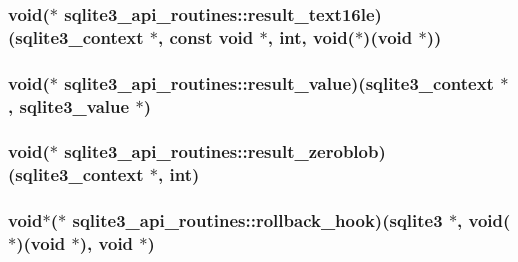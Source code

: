 \hypertarget{structsqlite3__api__routines_ac8f4c207ad255db5b0f8e0974fdcba16}{
\subsubsection[{result\-\_\-text16le}]{\setlength{\rightskip}{0pt plus 5cm}void($\ast$ sqlite3\-\_\-api\-\_\-routines\-::result\-\_\-text16le)({\bf sqlite3\-\_\-context} $\ast$, const void $\ast$, int, void($\ast$)(void $\ast$))}}\label{structsqlite3__api__routines_ac8f4c207ad255db5b0f8e0974fdcba16}
\hypertarget{structsqlite3__api__routines_ae1ff210b0883098bb16c807e0dae6a80}{
\subsubsection[{result\-\_\-value}]{\setlength{\rightskip}{0pt plus 5cm}void($\ast$ sqlite3\-\_\-api\-\_\-routines\-::result\-\_\-value)({\bf sqlite3\-\_\-context} $\ast$, {\bf sqlite3\-\_\-value} $\ast$)}}\label{structsqlite3__api__routines_ae1ff210b0883098bb16c807e0dae6a80}
\hypertarget{structsqlite3__api__routines_a5d27abfb3889e2fffdb6bd0b087ce390}{
\subsubsection[{result\-\_\-zeroblob}]{\setlength{\rightskip}{0pt plus 5cm}void($\ast$ sqlite3\-\_\-api\-\_\-routines\-::result\-\_\-zeroblob)({\bf sqlite3\-\_\-context} $\ast$, int)}}\label{structsqlite3__api__routines_a5d27abfb3889e2fffdb6bd0b087ce390}
\hypertarget{structsqlite3__api__routines_a980df7d8c480cf9f050e534d1d994efb}{
\subsubsection[{rollback\-\_\-hook}]{\setlength{\rightskip}{0pt plus 5cm}void$\ast$($\ast$ sqlite3\-\_\-api\-\_\-routines\-::rollback\-\_\-hook)({\bf sqlite3} $\ast$, void($\ast$)(void $\ast$), void $\ast$)}}\label{structsqlite3__api__routines_a980df7d8c480cf9f050e534d1d994efb}
